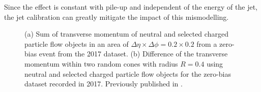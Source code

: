 Since the effect is constant with pile-up and independent of the energy of the jet, the jet calibration can greatly mitigate the impact of this mismodelling.

\begin{figure}[t]
    \caption[Sum of transverse momenta of particle flow objects and difference of the transverse momentum within two random cones.]{(a) Sum of transverse momentum of neutral and selected charged particle flow objects in an area of $\Delta \eta \times \Delta \phi = 0.2 \times 0.2$ from a zero-bias event from the 2017 dataset. (b) Difference of the transverse momentum within two random cones with radius $R = 0.4$ using neutral and selected charged particle flow objects for the zero-bias dataset recorded in 2017.
        Previously published in .}
    \label{fig:random-cones-balance}
\end{figure}

